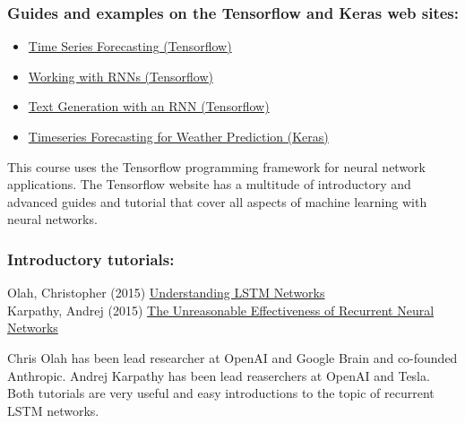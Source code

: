 \begin{tcolorbox}[colback=alert]
\subsubsection*{Guides and examples on the Tensorflow and Keras web sites:}

\begin{itemize}
\item \href{https://www.tensorflow.org/tutorials/structured_data/time_series}{Time Series Forecasting (Tensorflow)} \\
\item \href{https://www.tensorflow.org/guide/keras/working_with_rnns}{Working with RNNs (Tensorflow)} \\
\item \href{https://www.tensorflow.org/text/tutorials/text_generation}{Text Generation with an RNN (Tensorflow)} \\
\item \href{https://keras.io/examples/timeseries/timeseries_weather_forecasting/}{Timeseries Forecasting for Weather Prediction (Keras)}
\end{itemize}
\end{tcolorbox}

This course uses the Tensorflow programming framework for neural network applications. The Tensorflow website has a multitude of introductory and advanced guides and tutorial that cover all aspects of machine learning with neural networks. 

\begin{tcolorbox}[colback=alert]
\subsubsection*{Introductory tutorials:}

Olah, Christopher (2015) \href{https://colah.github.io/posts/2015-08-Understanding-LSTMs/}{Understanding LSTM Networks} \\

Karpathy, Andrej (2015) \href{https://karpathy.github.io/2015/05/21/rnn-effectiveness/}{The Unreasonable Effectiveness of Recurrent Neural Networks}
\end{tcolorbox}

Chris Olah has been lead researcher at OpenAI and Google Brain and co-founded Anthropic. Andrej Karpathy has been lead reaserchers at OpenAI and Tesla. Both tutorials are very useful and easy introductions to the topic of recurrent LSTM networks.

